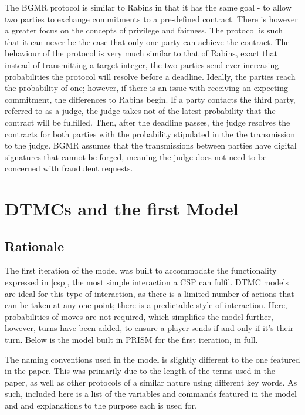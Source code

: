 \documentclass{l4proj}
\begin{document}
The BGMR protocol is similar to Rabins in that it has the same goal - to allow  two parties to exchange commitments to a pre-defined contract. There is however a greater focus on the concepts of privilege and fairness. The protocol is such that it can never be the case that only one party can achieve the contract. The behaviour of the protocol is very much similar to that of Rabins, exact that instead of transmitting a target integer, the two parties send ever increasing probabilities the protocol will resolve before a deadline. Ideally, the parties reach the probability of one; however, if there is an issue with receiving an expecting commitment, the differences to Rabins begin. If a party contacts the third party, referred to as a judge, the judge takes not of the latest probability that the contract will be fulfilled. Then, after the deadline passes, the judge resolves the contracts for both parties with the probability stipulated in the the transmission to the judge. BGMR assumes that the transmissions between parties have  digital signatures that cannot be forged, meaning the judge does not need to be concerned with fraudulent requests.





\chapter{DTMCs and the first Model}
\section{Rationale}
 The first iteration of the model was built to accommodate the functionality expressed in \ref{csp}, the most simple interaction a CSP can fulfil. DTMC models are ideal for this type of interaction, as there is a limited number of actions that can be taken at any one point; there is a predictable style of interaction. Here, probabilities of moves are not required, which simplifies the model further, however, turns have been added, to ensure a player sends if and only if it's their turn. Below is the model built in PRISM for the first iteration, in full.\\

\begin{center}

\end{center}

The naming conventions used in the model is slightly different to the one featured in the paper. This was primarily due to the length of the terms used in the paper, as well as other protocols of a similar nature using different key words. As such, included here is a list of the variables and commands featured in the model and and explanations to the purpose each is used for.
\end{document}
